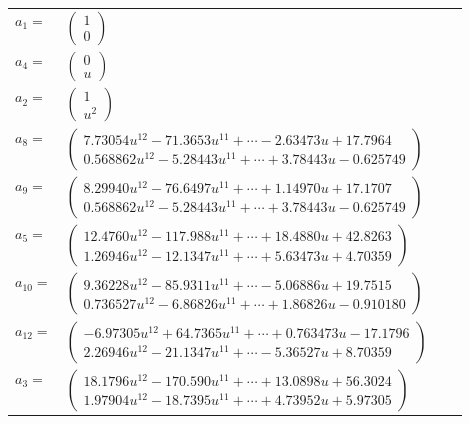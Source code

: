\documentclass[1p]{elsarticle_modified}
\theoremstyle{definition}
\begin{document}
\begin{tabular}{m{7pt} m{180pt} m{7pt} m{180pt} }
\flushright $a_{1}=$&$\begin{pmatrix}1\\0\end{pmatrix}$ \\
\flushright $a_{4}=$&$\begin{pmatrix}0\\u\end{pmatrix}$ \\
\flushright $a_{2}=$&$\begin{pmatrix}1\\u^2\end{pmatrix}$ \\
\flushright $a_{8}=$&$\begin{pmatrix}7.73054 u^{12}-71.3653 u^{11}+\cdots-2.63473 u+17.7964\\0.568862 u^{12}-5.28443 u^{11}+\cdots+3.78443 u-0.625749\end{pmatrix}$ \\
\flushright $a_{9}=$&$\begin{pmatrix}8.29940 u^{12}-76.6497 u^{11}+\cdots+1.14970 u+17.1707\\0.568862 u^{12}-5.28443 u^{11}+\cdots+3.78443 u-0.625749\end{pmatrix}$ \\
\flushright $a_{5}=$&$\begin{pmatrix}12.4760 u^{12}-117.988 u^{11}+\cdots+18.4880 u+42.8263\\1.26946 u^{12}-12.1347 u^{11}+\cdots+5.63473 u+4.70359\end{pmatrix}$ \\
\flushright $a_{10}=$&$\begin{pmatrix}9.36228 u^{12}-85.9311 u^{11}+\cdots-5.06886 u+19.7515\\0.736527 u^{12}-6.86826 u^{11}+\cdots+1.86826 u-0.910180\end{pmatrix}$ \\
\flushright $a_{12}=$&$\begin{pmatrix}-6.97305 u^{12}+64.7365 u^{11}+\cdots+0.763473 u-17.1796\\2.26946 u^{12}-21.1347 u^{11}+\cdots-5.36527 u+8.70359\end{pmatrix}$ \\
\flushright $a_{3}=$&$\begin{pmatrix}18.1796 u^{12}-170.590 u^{11}+\cdots+13.0898 u+56.3024\\1.97904 u^{12}-18.7395 u^{11}+\cdots+4.73952 u+5.97305\end{pmatrix}$ \\

\end{tabular}
\end{document}
